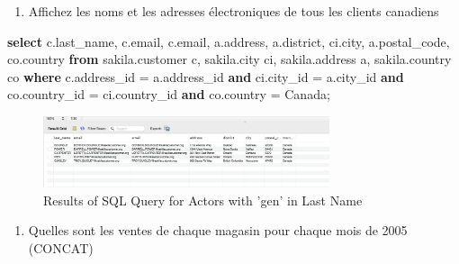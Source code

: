 \documentclass[12pt, french]{article}
\providecommand{\tightlist}{%
      \setlength{\itemsep}{0pt}\setlength{\parskip}{0pt}}
\newenvironment{Shaded}{}{}
\newcommand{\KeywordTok}[1]{\textcolor[rgb]{0.00,0.44,0.13}{\textbf{{#1}}}}
\newcommand{\StringTok}[1]{\textcolor[rgb]{0.25,0.44,0.63}{{#1}}}
\newcommand{\NormalTok}[1]{{#1}}
\newcommand{\OperatorTok}[1]{\textcolor[rgb]{0.40,0.40,0.40}{{#1}}}
\begin{document}
\begin{enumerate}
\def\labelenumi{\arabic{enumi}.}
\setcounter{enumi}{6}
\tightlist
\item
  Affichez les noms et les adresses électroniques de tous les clients
  canadiens
\end{enumerate}

\begin{Shaded}
\begin{Highlighting}[]
\KeywordTok{select}\NormalTok{ c.last\_name, c.email, c.email, a.address, a.district, ci.city, a.postal\_code, co.country }
\KeywordTok{from}\NormalTok{ sakila.customer c, sakila.city ci, sakila.address a, sakila.country co}
\KeywordTok{where} 
\NormalTok{    c.address\_id }\OperatorTok{=}\NormalTok{ a.address\_id }\KeywordTok{and}\NormalTok{ ci.city\_id }\OperatorTok{=}\NormalTok{ a.city\_id }
    \KeywordTok{and}\NormalTok{ co.country\_id }\OperatorTok{=}\NormalTok{ ci.country\_id }\KeywordTok{and}\NormalTok{ co.country }\OperatorTok{=} \StringTok{\textquotesingle{}Canada\textquotesingle{}}\NormalTok{;}
\end{Highlighting}
\end{Shaded}

\begin{figure}[H] %
    \centering
    \includegraphics[width=0.75\textwidth]{res/Q7.png}
    \caption{Results of SQL Query for Actors with 'gen' in Last Name}
    \label{fig:actors_with_gen}
\end{figure}

\begin{enumerate}
\def\labelenumi{\arabic{enumi}.}
\setcounter{enumi}{7}
\tightlist
\item
  Quelles sont les ventes de chaque magasin pour chaque mois de 2005
  (CONCAT)
\end{enumerate}
\end{document}
